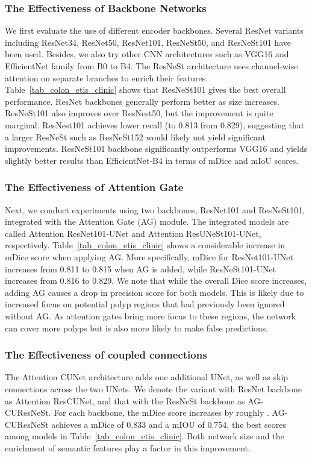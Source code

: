 \documentclass[review, sort&compress]{elsarticle}
\begin{document}
\subsubsection{The Effectiveness of Backbone Networks}
We first evaluate the use of different encoder backbones. Several ResNet variants including ResNet34, ResNet50, ResNet101, ResNeSt50, and ResNeSt101 have been used. Besides, we also try other CNN architectures such as VGG16 and EfficientNet family from B0 to B4. The ResNeSt architecture uses channel-wise attention on separate branches to enrich their features. Table~\ref{tab_colon_etis_clinic} shows that ResNeSt101 gives the best overall performance. ResNet backbones generally perform better as size increases. ResNeSt101 also improves over ResNest50, but the improvement is quite marginal. ResNest101 achieves lower recall (to 0.813 from 0.829), suggesting that a larger ResNeSt such as ResNeSt152 would likely not yield significant improvements. ResNeSt101 backbone significantly outperforms VGG16 and yields slightly better results than EfficientNet-B4 in terms of mDice and mIoU scores.

\subsubsection{The Effectiveness of Attention Gate}
Next, we conduct experiments using two backbones, ResNet101 and ResNeSt101, integrated with the Attention Gate (AG) module. The integrated models are called Attention ResNet101-UNet and Attention ResUNeSt101-UNet, respectively. Table~\ref{tab_colon_etis_clinic} shows a considerable increase in mDice score when applying AG. More specifically, mDice for ResNet101-UNet increases from 0.811 to 0.815 when AG is added, while ResNeSt101-UNet increases from 0.816 to 0.829. We note that while the overall Dice score increases, adding AG causes a drop in precision score for both models. This is likely due to increased focus on potential polyp regions that had previously been ignored without AG. As attention gates bring more focus to these regions, the network can cover more polyps but is also more likely to make false predictions.

\subsubsection{The Effectiveness of coupled connections}
The Attention CUNet architecture adds one additional UNet, as well as skip connections across the two UNets. We denote the variant with ResNet backbone as Attention ResCUNet, and that with the ResNeSt backbone as AG-CUResNeSt. For each backbone, the mDice score increases by roughly . AG-CUResNeSt achieves a mDice of 0.833 and a mIOU of 0.754, the best scores among models in Table~\ref{tab_colon_etis_clinic}. Both network size and the enrichment of semantic features play a factor in this improvement.
\end{document}
